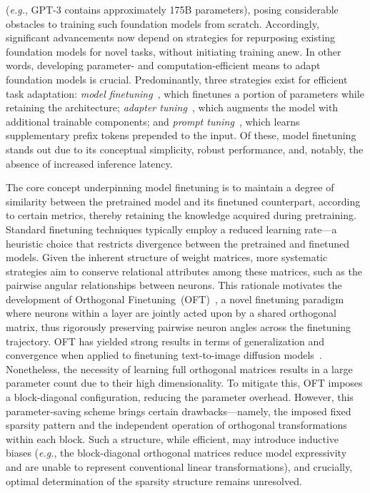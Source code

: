 (\emph{e.g.}, GPT-3 contains approximately 175B parameters), posing considerable obstacles to training such foundation models from scratch. Accordingly, significant advancements now depend on strategies for repurposing existing foundation models for novel tasks, without initiating training anew. In other words, developing parameter- and computation-efficient means to adapt foundation models is crucial. Predominantly, three strategies exist for efficient task adaptation: \emph{model finetuning}~\cite{hulora2022,zaken2022bitfit,guo2020parameter,raffel2020exploring,qiu2023controlling,zhang2022adaptive,chavan2023one}, which finetunes a portion of parameters while retaining the architecture; \emph{adapter tuning}~\cite{rebuffi2017learning,houlsby2019parameter,pfeiffer2020adapterfusion,lin2020exploring,he2021towards}, which augments the model with additional trainable components; and \emph{prompt tuning}~\cite{li2021prefix,lester2021power}, which learns supplementary prefix tokens prepended to the input. Of these, model finetuning stands out due to its conceptual simplicity, robust performance, and, notably, the absence of increased inference latency.

The core concept underpinning model finetuning is to maintain a degree of similarity between the pretrained model and its finetuned counterpart, according to certain metrics, thereby retaining the knowledge acquired during pretraining. Standard finetuning techniques typically employ a reduced learning rate—a heuristic choice that restricts divergence between the pretrained and finetuned models. Given the inherent structure of weight matrices, more systematic strategies aim to conserve relational attributes among these matrices, such as the pairwise angular relationships between neurons. This rationale motivates the development of Orthogonal Finetuning~(OFT)~\cite{qiu2023controlling}, a novel finetuning paradigm where neurons within a layer are jointly acted upon by a shared orthogonal matrix, thus rigorously preserving pairwise neuron angles across the finetuning trajectory. OFT has yielded strong results in terms of generalization and convergence when applied to finetuning text-to-image diffusion models~\cite{qiu2023controlling}. Nonetheless, the necessity of learning full orthogonal matrices results in a large parameter count due to their high dimensionality. To mitigate this, OFT imposes a block-diagonal configuration, reducing the parameter overhead. However, this parameter-saving scheme brings certain drawbacks—namely, the imposed fixed sparsity pattern and the independent operation of orthogonal transformations within each block. Such a structure, while efficient, may introduce inductive biases (\emph{e.g.}, the block-diagonal orthogonal matrices reduce model expressivity and are unable to represent conventional linear transformations), and crucially, optimal determination of the sparsity structure remains unresolved.

